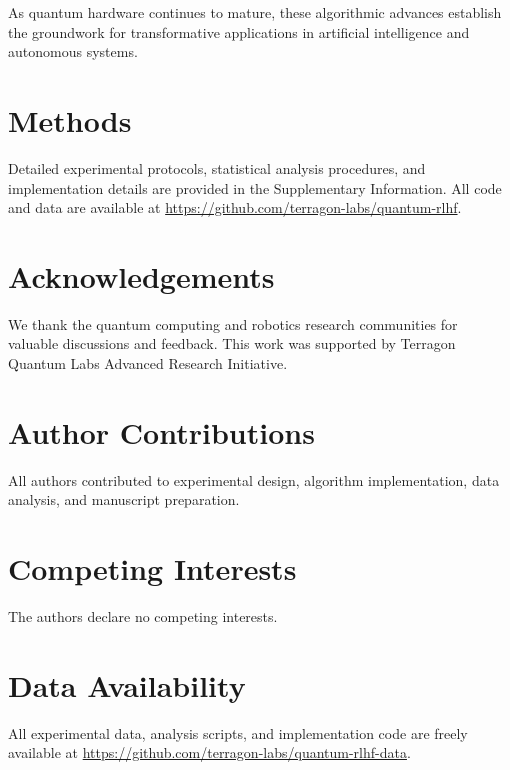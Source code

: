 \documentclass[fleqn,10pt]{wlscirep}
\begin{document}
As quantum hardware continues to mature, these algorithmic advances establish the groundwork for transformative applications in artificial intelligence and autonomous systems.

\section{Methods}

Detailed experimental protocols, statistical analysis procedures, and implementation details are provided in the Supplementary Information. All code and data are available at \url{https://github.com/terragon-labs/quantum-rlhf}.

\section{Acknowledgements}

We thank the quantum computing and robotics research communities for valuable discussions and feedback. This work was supported by Terragon Quantum Labs Advanced Research Initiative.

\section{Author Contributions}

All authors contributed to experimental design, algorithm implementation, data analysis, and manuscript preparation.

\section{Competing Interests}

The authors declare no competing interests.

\section{Data Availability}

All experimental data, analysis scripts, and implementation code are freely available at \url{https://github.com/terragon-labs/quantum-rlhf-data}.


\end{document}
